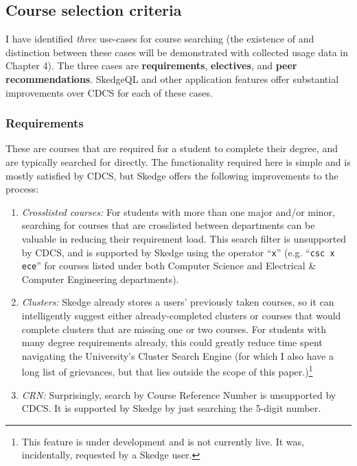\subsection{Course selection criteria}

I have identified \emph{three} use-cases for course searching (the existence of and distinction between these cases will be demonstrated with collected usage data in Chapter 4). The three cases are \textbf{requirements}, \textbf{electives}, and \textbf{peer recommendations}. SkedgeQL and other application features offer substantial improvements over CDCS for each of these cases. 

  \subsubsection{Requirements}

  These are courses that are required for a student to complete their degree, and are typically searched for directly. The functionality required here is simple and is mostly satisfied by CDCS, but Skedge offers the following improvements to the process:

  \begin{enumerate}
    \item \emph{Crosslisted courses:} For students with more than one major and/or minor, searching for courses that are crosslisted between departments can be valuable in reducing their requirement load. This search filter is unsupported by CDCS, and is supported by Skedge using the operator ``{\tt x}'' (e.g. ``{\tt csc x ece}'' for courses listed under both Computer Science and Electrical \& Computer Engineering departments).

    \item \emph{Clusters:} Skedge already stores a users' previously taken courses, so it can intelligently suggest either already-completed clusters or courses that would complete clusters that are missing one or two courses. For students with many degree requirements already, this could greatly reduce time spent navigating the University's Cluster Search Engine (for which I also have a long list of grievances, but that lies outside the scope of this paper.)\footnote{This feature is under development and is not currently live. It was, incidentally, requested by a Skedge user.}

    \item \emph{CRN:} Surprisingly, search by Course Reference Number is unsupported by CDCS. It is supported by Skedge by just searching the 5-digit number.
  \end{enumerate}

